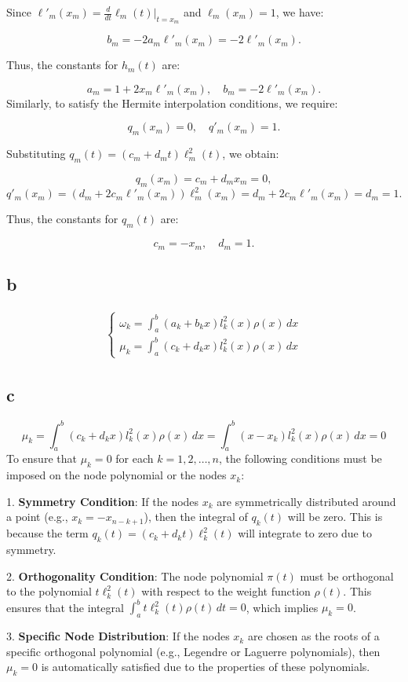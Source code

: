 \documentclass[a4paper]{article}
\begin{document}
Since \( \ell'_m(x_m) = \frac{d}{dt} \ell_m(t) \bigg|_{t=x_m} \) and \( \ell_m(x_m) = 1 \), we have:

\[
b_m = -2a_m \ell'_m(x_m) = -2 \ell'_m(x_m).
\]

Thus, the constants for \( h_m(t) \) are:

\[
a_m = 1 + 2x_m\ell'_m(x_m), \quad b_m = -2 \ell'_m(x_m).
\]
Similarly, to satisfy the Hermite interpolation conditions, we require:

\[
q_m(x_m) = 0, \quad q'_m(x_m) = 1.
\]

Substituting \( q_m(t) = (c_m + d_m t) \ell_m^2(t) \), we obtain:

\[
q_m(x_m) = c_m +d_mx_m = 0,
\]
\[
q'_m(x_m) = (d_m + 2c_m \ell'_m(x_m)) \ell_m^2(x_m) = d_m + 2c_m \ell'_m(x_m) = d_m = 1.
\]

Thus, the constants for \( q_m(t) \) are:

\[
c_m = -x_m, \quad d_m = 1.
\]\cite*{deepseek}

\subsection*{b}
\begin{align*}
  \left\{
  \begin{array}{l}
    \omega_k = \int_{a}^{b} (a_k+b_kx)l_k^2(x)\rho(x)  \,dx \\
    \mu_k = \int_{a}^{b} (c_k+d_kx)l_k^2(x)\rho(x)  \,dx
  \end{array}
  \right.
\end{align*}

\subsection*{c}
$$\mu_k = \int_{a}^{b} (c_k+d_kx)l_k^2(x)\rho(x)  \,dx = \int_{a}^{b} (x - x_k)l_k^2(x)\rho(x)  \,dx =0  $$
To ensure that \( \mu_k = 0 \) for each \( k = 1, 2, \ldots, n \), the following conditions must be imposed on the node polynomial or the nodes \( x_k \):

1. \textbf{Symmetry Condition}: If the nodes \( x_k \) are symmetrically distributed around a point (e.g., \( x_k = -x_{n-k+1} \)), then the integral of \( q_k(t) \) will be zero. This is because the term \( q_k(t) = (c_k + d_k t) \ell_k^2(t) \) will integrate to zero due to symmetry.

2. \textbf{Orthogonality Condition}: The node polynomial \( \pi(t) \) must be orthogonal to the polynomial \( t \ell_k^2(t) \) with respect to the weight function \( \rho(t) \). This ensures that the integral \( \int_{a}^{b} t \ell_k^2(t) \rho(t) \, dt = 0 \), which implies \( \mu_k = 0 \).

3. \textbf{Specific Node Distribution}: If the nodes \( x_k \) are chosen as the roots of a specific orthogonal polynomial (e.g., Legendre or Laguerre polynomials), then \( \mu_k = 0 \) is automatically satisfied due to the properties of these polynomials.


\section*{  }
\printbibliography
\end{document}
